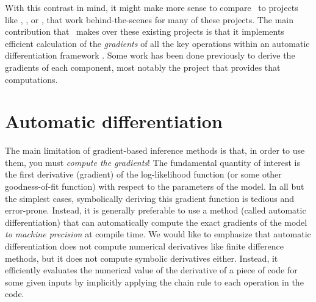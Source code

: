 \documentclass[modern]{aastex62}
\begin{document}
With this contrast in mind, it might make more sense to compare \exoplanet\ to projects like  \citep{Kreidberg:2015},  \citep{Maxted:2016}, or  \citep{Foreman-Mackey:2017}, that work behind-the-scenes for many of these projects.
The main contribution that \exoplanet\ makes over these existing projects is that it implements efficient calculation of the \emph{gradients} of all the key operations within an automatic differentiation framework \citep{Theano-Development-Team:2016}.
Some work has been done previously to derive the gradients of each component, most notably the  project \citep{Luger:2019} that provides that computations.








\section{Automatic differentiation}

The main limitation of gradient-based inference methods is that, in order to
use them, you must \emph{compute the gradients}!
The fundamental quantity of interest is the first derivative (gradient) of the
log-likelihood function (or some other goodness-of-fit function) with respect
to the parameters of the model.
In all but the simplest cases, symbolically deriving this gradient function is
tedious and error-prone.
Instead, it is generally preferable to use a method (called automatic
differentiation) that can automatically compute the exact gradients of the
model \emph{to machine precision} at compile time.
We would like to emphasize that automatic differentiation does not compute numerical derivatives like finite difference methods, but it does not compute symbolic derivatives either.
Instead, it efficiently evaluates the numerical value of the derivative of a piece of code for some given inputs by implicitly applying the chain rule to each operation in the code.
\end{document}
